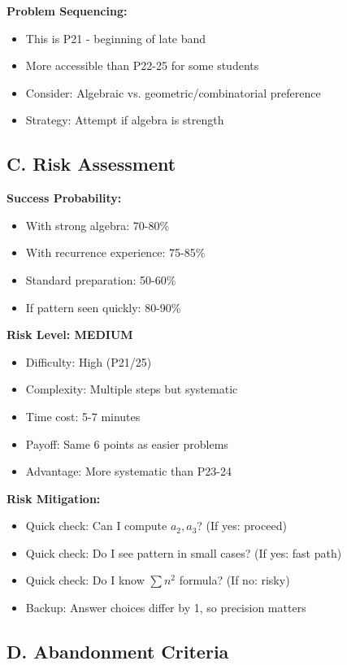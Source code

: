 \documentclass[12pt]{article}
\begin{document}
\begin{competitionbox}
\textbf{Problem Sequencing:}
\begin{itemize}
    \item This is P21 - beginning of late band
    \item More accessible than P22-25 for some students
    \item Consider: Algebraic vs. geometric/combinatorial preference
    \item Strategy: Attempt if algebra is strength
\end{itemize}

\subsection*{C. Risk Assessment}

\textbf{Success Probability:}
\begin{itemize}
    \item With strong algebra: 70-80\%
    \item With recurrence experience: 75-85\%
    \item Standard preparation: 50-60\%
    \item If pattern seen quickly: 80-90\%
\end{itemize}

\textbf{Risk Level: MEDIUM}
\begin{itemize}
    \item Difficulty: High (P21/25)
    \item Complexity: Multiple steps but systematic
    \item Time cost: 5-7 minutes
    \item Payoff: Same 6 points as easier problems
    \item Advantage: More systematic than P23-24
\end{itemize}

\textbf{Risk Mitigation:}
\begin{itemize}
    \item Quick check: Can I compute $a_2, a_3$? (If yes: proceed)
    \item Quick check: Do I see pattern in small cases? (If yes: fast path)
    \item Quick check: Do I know $\sum n^2$ formula? (If no: risky)
    \item Backup: Answer choices differ by 1, so precision matters
\end{itemize}

\subsection*{D. Abandonment Criteria}


\end{competitionbox}
\end{document}
